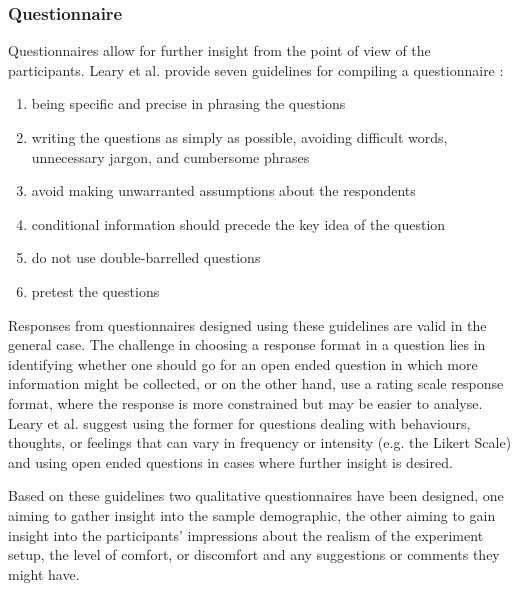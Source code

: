 \subsubsection{Questionnaire}
Questionnaires allow for further insight from the point of view of the participants. Leary et al. provide seven guidelines for compiling a questionnaire \cite{leary}:
\begin{enumerate}
	\item being specific and precise in phrasing the questions
	\item writing the questions as simply as possible, avoiding difficult words, unnecessary jargon, and cumbersome phrases
	\item avoid making unwarranted assumptions about the respondents
	\item conditional information should precede the key idea of the question
	\item do not use double-barrelled questions
	\item pretest the questions
\end{enumerate}
Responses from questionnaires designed using these guidelines are valid in the general case. The challenge in choosing a response format in a question lies in identifying whether one should go for an open ended question in which more information might be collected, or on the other hand, use a rating scale response format, where the response is more constrained but may be easier to analyse. Leary et al. suggest using the former for questions dealing with behaviours, thoughts, or feelings that can vary in frequency or intensity (e.g. the Likert Scale\cite{likert1932technique}) and using open ended questions in cases where further insight is desired.

Based on these guidelines two qualitative questionnaires have been designed, one aiming to gather insight into the sample demographic, the other aiming to gain insight into the participants' impressions about the realism of the experiment setup, the level of comfort, or discomfort and any suggestions or comments they might have. 

